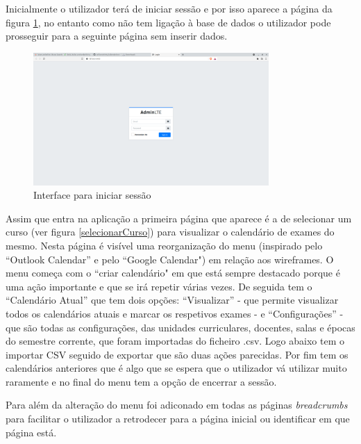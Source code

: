 \documentclass[11pt, twoside]{report}
\begin{document}
	Inicialmente o utilizador terá de iniciar sessão e por isso aparece a página da figura \ref{login}, no entanto como não tem ligação à base de dados o utilizador pode prosseguir para a seguinte página sem inserir dados. 
	
	\begin{figure}[H] 
		\centering 							\includegraphics[width=0.8\textwidth,height=0.8\textheight,keepaspectratio]{image/PrototipoAFNF/login}
		\caption{Interface para iniciar sessão}
		\label{login}
	\end{figure}
	
	Assim que entra na aplicação a primeira página que aparece é a de selecionar um curso (ver figura \ref{selecionarCurso}) para visualizar o calendário de exames do mesmo. Nesta página é visível uma reorganização do menu (inspirado pelo ``Outlook Calendar'' e pelo ``Google Calendar") em relação aos wireframes. O menu começa com o ``criar calendário" em que está sempre destacado porque é uma ação importante e que se irá repetir várias vezes. De seguida tem o ``Calendário Atual'' que tem dois opções: ``Visualizar'' - que permite visualizar todos os calendários atuais e marcar os respetivos exames - e ``Configurações'' - que são todas as configurações, das unidades curriculares, docentes, salas e épocas do semestre corrente, que foram importadas do ficheiro .csv. Logo abaixo tem o importar CSV seguido de exportar que são duas ações parecidas. Por fim tem os calendários anteriores que é algo que se espera que o utilizador vá utilizar muito raramente e no final do menu tem a opção de encerrar a sessão.
	
	Para além da alteração do menu foi adiconado em todas as páginas \textit{breadcrumbs} para facilitar o utilizador a retrodecer para a página inicial ou identificar em que página está.  
	
\end{document}
